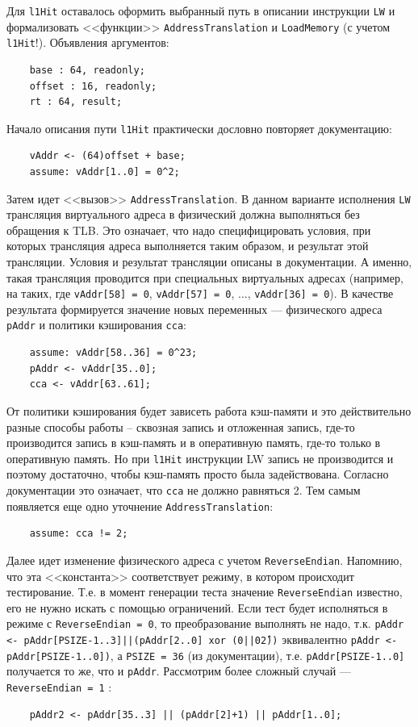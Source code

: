 Для \texttt{l1Hit} оставалось оформить выбранный путь в описании инструкции
\texttt{LW} и формализовать <<функции>> \texttt{AddressTranslation} и
\texttt{LoadMemory} (с учетом \texttt{l1Hit}!). Объявления аргументов:
\begin{verbatim}
    base : 64, readonly;
    offset : 16, readonly;
    rt : 64, result;
\end{verbatim}

Начало описания пути \texttt{l1Hit} практически дословно повторяет документацию:
\begin{verbatim}
    vAddr <- (64)offset + base;
    assume: vAddr[1..0] = 0^2;
\end{verbatim}

Затем идет <<вызов>> \texttt{AddressTranslation}. В данном варианте исполнения
\texttt{LW} трансляция виртуального адреса в физический должна выполняться без
обращения к TLB. Это означает, что надо специфицировать условия, при которых
трансляция адреса выполняется таким образом, и результат этой трансляции.
Условия и результат трансляции описаны в документации. А именно, такая
трансляция проводится при специальных виртуальных адресах (например, на таких,
где \texttt{vAddr[58] = 0}, \texttt{vAddr[57] = 0}, ..., \texttt{vAddr[36] =
0}). В качестве результата формируется значение новых переменных --- физического
адреса \texttt{pAddr} и политики кэширования \texttt{cca}:
\begin{verbatim}
    assume: vAddr[58..36] = 0^23;
    pAddr <- vAddr[35..0];
    cca <- vAddr[63..61];
\end{verbatim}

От политики кэширования будет зависеть работа кэш-памяти и это действительно
разные способы работы -- сквозная запись и отложенная запись, где-то
производится запись в кэш-память и в оперативную память, где-то только в
оперативную память. Но при \texttt{l1Hit} инструкции LW запись не производится и
поэтому достаточно, чтобы кэш-память просто была задействована. Согласно
документации это означает, что \texttt{cca} не должно равняться 2. Тем самым
появляется еще одно уточнение \texttt{AddressTranslation}:
\begin{verbatim}
    assume: cca != 2;
\end{verbatim}

Далее идет изменение физического адреса с учетом \texttt{ReverseEndian}.
Напомнию, что эта <<константа>> соответствует режиму, в котором происходит
тестирование. Т.е. в момент генерации теста значение \texttt{ReverseEndian}
известно, его не нужно искать с помощью ограничений. Если тест будет исполняться
в режиме с \texttt{ReverseEndian = 0}, то преобразование выполнять не надо, т.к.
\texttt{pAddr <- pАddr[PSIZE-1..3]||(pAddr[2..0] xor (0||0\^2))} эквивалентно
\texttt{pAddr <- pАddr[PSIZE-1..0])}, а \texttt{PSIZE = 36} (из документации),
т.е. \texttt{pАddr[PSIZE-1..0]} получается то же, что и \texttt{pАddr}.
Рассмотрим более сложный случай ---\\ \texttt{ReverseEndian = 1} :
\begin{verbatim}
    pAddr2 <- pAddr[35..3] || (pAddr[2]+1) || pAddr[1..0];
\end{verbatim}


